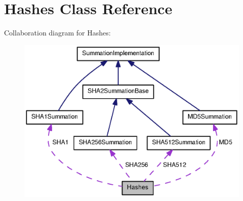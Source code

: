 \section{\-Hashes \-Class \-Reference}
\label{classHashes}


\-Collaboration diagram for \-Hashes\-:
\nopagebreak
\begin{figure}[H]
\begin{center}
\leavevmode
\includegraphics[width=350pt]{classHashes__coll__graph}
\end{center}
\end{figure}

